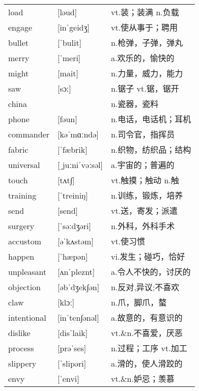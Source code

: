 \documentclass[a4paper]{article}
\begin{document}
\section{}
\begin{tabular}{l l l}

load & [ləud] & vt.装；装满 n.负载 \\
engage & [inˈgeidʒ] & vt.使从事于；聘用 \\
bullet & [ˈbulit] & n.枪弹，子弹，弹丸 \\
merry & [ˈmeri] & a.欢乐的，愉快的 \\
might & [mait] & n.力量，威力，能力 \\
saw & [sɔː] & n.锯子 vt.锯，锯开 \\
china &  & n.瓷器，瓷料 \\
phone & [fəun] & n.电话，电话机；耳机 \\
commander & [kəˈmɑːndə] & n.司令官，指挥员 \\
fabric & [ˈfæbrik] & n.织物，纺织品；结构 \\
universal & [ˌjuːniˈvəːsəl] & a.宇宙的；普遍的 \\
touch & [tʌt∫] & vt.触摸；触动 n.触 \\
training & [ˈtreiniŋ] & n.训练，锻炼，培养 \\
send & [send] & vt.送，寄发；派遣 \\
surgery & [ˈsəːdʒəri] & n.外科，外科手术 \\
accustom & [əˈkʌstəm] & vt.使习惯 \\
happen & [ˈhæpən] & vi.发生；碰巧，恰好 \\
unpleasant & [ʌnˈpleznt] & a.令人不快的，讨厌的 \\
objection & [əbˈdʒek∫ən] & n.反对,异议;不喜欢 \\
claw & [klɔː] & n.爪，脚爪，螯 \\
intentional & [inˈten∫ənəl] & a.故意的，有意识的 \\
dislike & [disˈlaik] & vt.\&n.不喜爱，厌恶 \\
process & [prəˈses] & n.过程；工序 vt.加工 \\
slippery & [ˈslipəri] & a.滑的，使人滑跤的 \\
envy & [ˈenvi] & vt.\&n.妒忌；羡慕 \\

\end{tabular}
\end{document}
